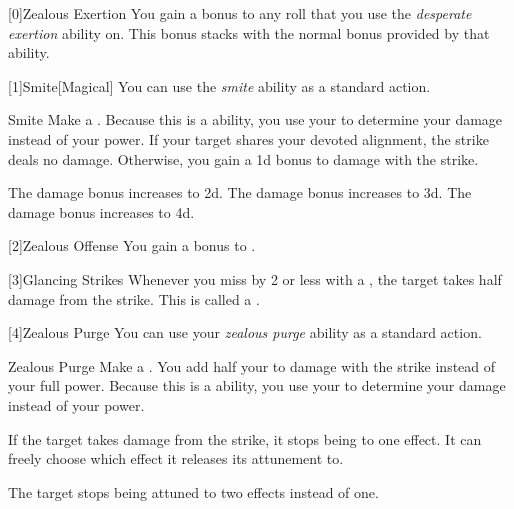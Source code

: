         [0]{Zealous Exertion} You gain a  bonus to any roll that you use the \textit{desperate exertion} ability on.
        This bonus stacks with the normal  bonus provided by that ability.

        [1]{Smite}[Magical] You can use the \textit{smite} ability as a standard action.
        \begin{freeability}{Smite}
            Make a .
            Because this is a  ability, you use your   to determine your damage instead of your  power.
            If your target shares your devoted alignment, the strike deals no damage.
            Otherwise, you gain a \plus1d bonus to damage with the strike.

            \rankline
             The damage bonus increases to \plus2d.
             The damage bonus increases to \plus3d.
             The damage bonus increases to \plus4d.
        \end{freeability}

        [2]{Zealous Offense} You gain a  bonus to .

        [3]{Glancing Strikes} Whenever you miss by 2 or less with a , the target takes half damage from the strike.
        This is called a .

        [4]{Zealous Purge} You can use your \textit{zealous purge} ability as a standard action.
        \begin{freeability}{Zealous Purge}
            Make a .
            You add half your  to damage with the strike instead of your full power.
            Because this is a  ability, you use your   to determine your damage instead of your  power.

            If the target takes damage from the strike, it stops being  to one effect.
            It can freely choose which effect it releases its attunement to.

            \rankline
             The target stops being attuned to two effects instead of one.
        \end{freeability}


